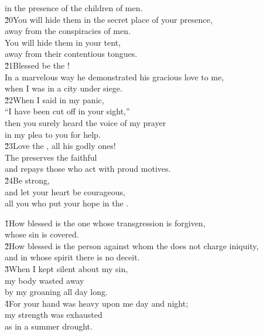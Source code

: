 \begin{poetry}
\poemll    in the presence of the children of men. \\
\poeml \v{20}You will hide them in the secret place of your presence, \\
\poemll    away from the conspiracies of men. \\
\poeml You will hide them in your tent, \\
\poemll    away from their contentious tongues. \\
\poeml \v{21}Blessed be the ! \\
\poemll    In a marvelous way he demonstrated his gracious love to me, \\
\poemlll       when I was in a city under siege. \\
\poeml \v{22}When I said in my panic, \\
\poemll    ``I have been cut off in your sight,'' \\
\poeml then you surely heard the voice of my prayer \\
\poemll    in my plea to you for help. \\
\poeml \v{23}Love the , all his godly ones! \\
\poemll    The  preserves the faithful \\
\poemlll       and repays those who act with proud motives. \\
\poeml \v{24}Be strong, \\
\poemll    and let your heart be courageous, \\
\poemlll       all you who put your hope in the .
\end{poetry}

\begin{poetry}
\poeml \v{1}How blessed is the one whose transgression is forgiven, \\
\poemll    whose sin is covered. \\
\poeml \v{2}How blessed is the person against whom the  does not charge iniquity, \\
\poemll    and in whose spirit there is no deceit. \\
\poeml \v{3}When I kept silent about my sin, \\
\poemll    my body wasted away \\
\poemlll       by my groaning all day long. \\
\poeml \v{4}For your hand was heavy upon me day and night; \\
\poemll    my strength was exhausted \\
\poemlll       as in a summer drought.
\end{poetry}

